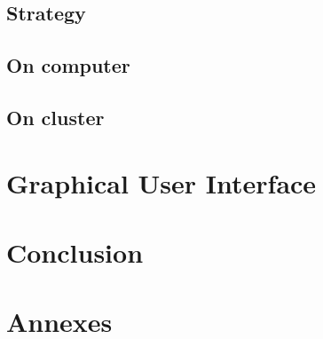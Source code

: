 \documentclass[12pt]{article}
\begin{document}
	\subsection{Strategy}			\label{sec:strategy}			
	\subsection{On computer}		\label{sec:computer}			
	\subsection{On cluster}			\label{sec:cluster}			

\newpage
\section{Graphical User Interface}		\label{sec:gui}				

\newpage
	\section{Conclusion}			\label{sec:conclusion}			
\newpage


\newpage
	\section{Annexes}			\label{sec:annexes}			
\newpage



\end{document}
